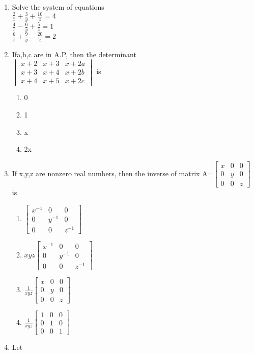 \begin{enumerate}[label=\arabic*.,ref=\thesubsection.\theenumi]
\item Solve the system of equations \\$\frac{2}{x}+\frac{3}{y}+\frac{10}{z}=4$\\$\frac{4}{x}-\frac{6}{y}+\frac{5}{z}=1$\\$\frac{6}{x}+\frac{9}{y}-\frac{20}{z}=2$\\
\item Ifa,b,c are in A.P, then the determinant\\
 $\begin{vmatrix}
x+2&x+3&x+2a \\ x+3&x+4&x+2b \\x+4&x+5&x+2c
\end{vmatrix}$ is 
\begin{enumerate}
\item 0
\item 1
\item x
\item 2x
\end{enumerate}
\item If x,y,z are nonzero real numbers, then the inverse of matrix 
A=$\begin{bmatrix}
x&0&0 \\ 0&y&0 \\ 0&0&z
\end{bmatrix}$ is 
\begin{enumerate}
\item $\begin{bmatrix} x^{-1}&0&0 \\ 0&y^{-1}&0 \\ 0&0&z^{-1} \end{bmatrix}$ 
\item $xyz\begin{bmatrix} x^{-1}&0&0 \\ 0&y^{-1}&0 \\ 0&0&z^{-1} \end{bmatrix}$ 
\item $\frac{1}{xyz}\begin{bmatrix} x&0&0 \\ 0&y&0 \\ 0&0&z \end{bmatrix}$ 
\item $\frac{1}{xyz}\begin{bmatrix} 1&0&0 \\ 0&1&0 \\ 0&0&1 \end{bmatrix}$ 
\end{enumerate}
\item Let 

\end{enumerate}
